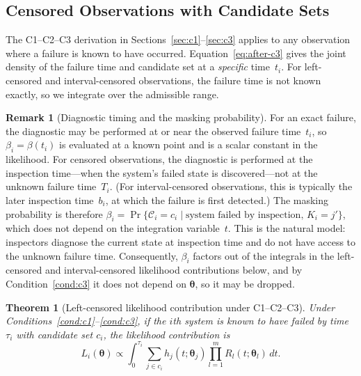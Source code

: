 \documentclass[11pt]{article}
\theoremstyle{definition}
\newtheorem{remark}{Remark}
\theoremstyle{plain}
\newtheorem{theorem}{Theorem}
\renewcommand{\v}[1]{\boldsymbol{#1}}
\newcommand{\btheta}{\v{\theta}}
\begin{document}
\subsection{Censored Observations with Candidate Sets}
\label{sec:censored-masked}

The C1--C2--C3 derivation in Sections~\ref{sec:c1}--\ref{sec:c3} applies to
any observation where a failure is known to have occurred.
Equation~\eqref{eq:after-c3} gives the joint density of the failure time
and candidate set at a \emph{specific} time~$t_i$.
For left-censored and interval-censored observations, the failure time
is not known exactly, so we integrate over the admissible range.

\begin{remark}[Diagnostic timing and the masking probability]
\label{rem:diagnostic-timing}
For an exact failure, the diagnostic may be performed at or near the
observed failure time~$t_i$, so $\beta_i = \beta(t_i)$ is evaluated at a
known point and is a scalar constant in the likelihood.
For censored observations, the diagnostic is performed at the inspection
time---when the system's failed state is discovered---not at the unknown
failure time~$T_i$.
(For interval-censored observations, this is typically the later
inspection time~$b_i$, at which the failure is first detected.)
The masking probability is therefore
$\beta_i = \Pr\{\mathcal{C}_i = c_i \mid \text{system failed by
inspection},\, K_i = j'\}$,
which does not depend on the integration variable~$t$.
This is the natural model: inspectors diagnose the current state at
inspection time and do not have access to the unknown failure time.
Consequently, $\beta_i$ factors out of the integrals in the left-censored
and interval-censored likelihood contributions below, and by
Condition~\ref{cond:c3} it does not depend on $\btheta$, so it may be
dropped.
\end{remark}

\begin{theorem}[Left-censored likelihood contribution under C1--C2--C3]
\label{thm:left-censored}
Under Conditions~\ref{cond:c1}--\ref{cond:c3}, if the $i$th system is
known to have failed by time $\tau_i$ with candidate set $c_i$, the
likelihood contribution is
\begin{equation}
\label{eq:left-censored}
    L_i(\btheta) \propto
    \int_0^{\tau_i}
    \sum_{j \in c_i} h_j(t; \v{\theta}_j)
    \prod_{l=1}^m R_l(t; \v{\theta}_l) \, dt.
\end{equation}
\end{theorem}
\end{document}
